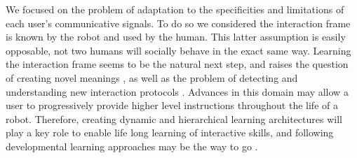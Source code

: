 We focused on the problem of adaptation to the specificities and limitations of each user's communicative signals. To do so we considered the interaction frame is known by the robot and used by the human. This latter assumption is easily opposable, not two humans will socially behave in the exact same way. Learning the interaction frame seems to be the natural next step, and raises the question of creating novel meanings \cite{steels2002aibos}, as well as the problem of detecting and understanding new interaction protocols \cite{mohammad2010learning,macl11simul}. Advances in this domain may allow a user to progressively provide higher level instructions throughout the life of a robot. Therefore, creating dynamic and hierarchical learning architectures will play a key role to enable life long learning of interactive skills, and following developmental learning approaches may be the way to go \cite{lungarella2003developmental,demiris2005motor,lopes2007developmental}.









